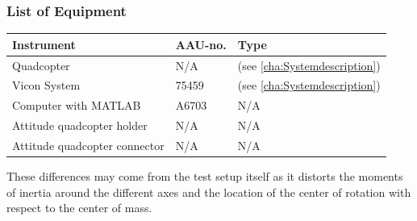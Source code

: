 \subsubsection{List of Equipment}
\begin{table}[H]
    \centering
	\begin{tabular}{|l|l|p{4.3cm}|}
		\hline%
		\textbf{Instrument}   &  \textbf{AAU-no.}  &  \textbf{Type}                       \\
		\hline%
		Quadcopter    	&  N/A 						&  (see \autoref{cha:Systemdescription}) 		      	 \\
		\hline%
	    Vicon System 			& 75459                 &  (see \autoref{cha:Systemdescription})                  \\
		\hline%
		Computer with MATLAB       &  A6703		 & N/A     \\
		\hline%
		Attitude quadcopter holder      &  N/A		 & N/A     \\
		\hline%
		Attitude quadcopter connector    &  N/A		 & N/A     \\
		\hline%
	\end{tabular}
\end{table}


These differences may come from the test setup itself as it distorts the moments of inertia around the different axes and the location of the center of rotation with respect to the center of mass. %
